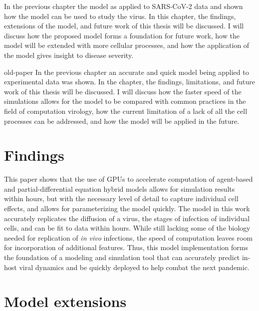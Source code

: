 In the previous chapter the model as applied to SARS-CoV-2 data and shown how the model can be used to study the virus. In this chapter, the findings, extensions of the model, and future work of this thesis will be discussed. I will discuss how the proposed model forms a foundation for future work, how the model will be extended with more cellular processes, and how the application of the model gives insight to disease severity.

old-paper
In the previous chapter an accurate and quick model being applied to experimental data was shown. In the chapter, the findings, limitations, and future work of this thesis will be discussed. I will discuss how the faster speed of the simulations allows for the model to be compared with common practices in the field of computation virology, how the current limitation of a lack of all the cell processes can be addressed, and how the model will be applied in the future.

\section{Findings}

This paper shows that the use of GPUs to accelerate computation of agent-based and partial-differential equation hybrid models allows for simulation results within hours, but with the necessary level of detail to capture individual cell effects, and allows for parameterizing the model quickly. The model in this work accurately replicates the diffusion of a virus, the stages of infection of individual cells, and can be fit to data within hours. While still lacking some of the biology needed for replication of \emph{in vivo} infections, the speed of computation leaves room for incorporation of additional features. Thus, this model implementation forms the foundation of a modeling and simulation tool that can accurately predict in-host viral dynamics and be quickly deployed to help combat the next pandemic. 

\section{Model extensions}

